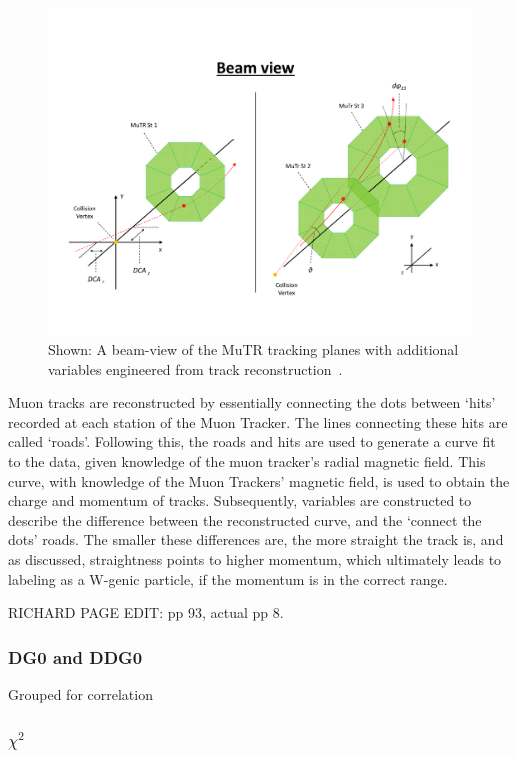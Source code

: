 \begin{figure}[ht]
  \centering
  \includegraphics[width=\textwidth]{./figures/kinvar_beam_view.pdf}
  \caption{
    Shown: A beam-view of the MuTR tracking planes with additional variables
    engineered from track reconstruction~\cite{Kim2016}.
  }
  \label{fig:kinvar_beam_view}
\end{figure}

Muon tracks are reconstructed by essentially connecting the dots between `hits'
recorded at each station of the Muon Tracker.  The lines connecting these hits
are called `roads'.  Following this, the roads and hits are used to generate a
curve fit to the data, given knowledge of the muon tracker's radial magnetic
field. This curve, with knowledge of the Muon Trackers' magnetic field, is used
to obtain the charge and momentum of tracks.  Subsequently, variables are
constructed to describe the difference between the reconstructed curve, and the
`connect the dots' roads.  The smaller these differences are, the more straight
the track is, and as discussed, straightness points to higher momentum, which
ultimately leads to labeling as a W-genic particle, if the momentum is in the
correct range.

\edithere{}
RICHARD PAGE EDIT: pp 93, actual pp 8.

\subsubsection{DG0 and DDG0}

Grouped for correlation
\subsubsection{$\chi^2$}

